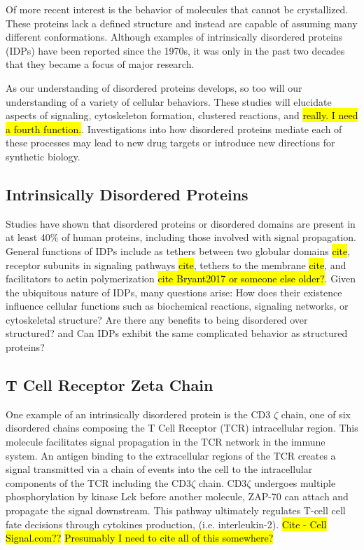 \documentclass[../AdvancementSummary.tex]{subfiles}
\begin{document}
Of more recent interest is the behavior of molecules that cannot be crystallized. These proteins lack a defined structure and instead are capable of assuming many different conformations. Although examples of intrinsically disordered proteins (IDPs) have been reported since the 1970s, it was only in the past two decades that they became a focus of major research. \cite{Dunker2008} 

As our understanding of disordered proteins develops, so too will our understanding of a variety of cellular behaviors. These studies will elucidate aspects of signaling, cytoskeleton formation, clustered reactions, and \hl{really.  I need a fourth function.}. Investigations into how disordered proteins mediate each of these processes may lead to new drug targets or introduce new directions for synthetic biology.


\subsection{Intrinsically Disordered Proteins}

Studies have shown that disordered proteins or disordered domains are present in at least 40\% of human proteins, including those involved with signal propagation.\cite{Tompa2012} General functions of IDPs include as tethers between two globular domains \hl{cite}, receptor subunits in signaling pathways \hl{cite}, tethers to the membrane \hl{cite}, and facilitators to actin polymerization \hl{cite Bryant2017 or someone else older?}. Given the ubiquitous nature of IDPs, many questions arise: How does their existence influence cellular functions such as biochemical reactions, signaling networks, or cytoskeletal structure?  Are there any benefits to being disordered over structured? and Can IDPs exhibit the same complicated behavior as structured proteins?

\subsection{T Cell Receptor Zeta Chain}

One example of an intrinsically disordered protein is the CD3 $\zeta$ chain, one of six disordered chains composing the T Cell Receptor (TCR) intracellular region. This molecule facilitates signal propagation in the TCR network in the immune system.  An antigen binding to the extracellular regions of the TCR creates a signal transmitted via a chain of events into the cell to the intracellular components of the TCR including the CD3$\zeta$ chain.  CD3$\zeta$ undergoes multiple phosphorylation by kinase Lck before another molecule, ZAP-70 can attach and propagate the signal downstream. This pathway ultimately regulates T-cell cell fate decisions through cytokines production, (i.e. interleukin-2). \hl{Cite - Cell Signal.com??} \hl{Presumably I need to cite all of this somewhere?}
\end{document}
